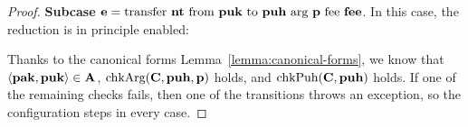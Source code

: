 \begin{proof}
  \textbf{Subcase } $\EXPR =
  \TRANSFER[\PARAMETER]\NTEZ\PUK{\PUH}\MTEZ$. In this case, the
   reduction is in principle enabled:
  \begin{mathpar}
  \end{mathpar}
  Thanks to the canonical forms Lemma~\ref{lemma:canonical-forms}, we
  know that $\Angle{\PAK,\PUK} \in \ACCOUNTS$, $\CHECKARG
  (\CONTRACTORS, \PUH, \PARAMETER)$ holds, and $\CHECKPUH
  (\CONTRACTORS, \PUH)$ holds. If one of the remaining checks fails,
  then one of the  transitions throws an
  exception, so the configuration steps in every case. 


\end{proof}
